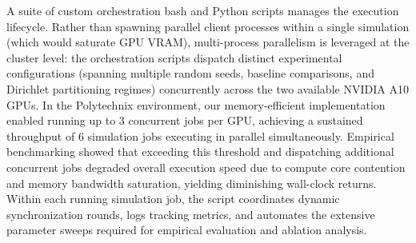 A suite of custom orchestration bash and Python scripts manages the execution lifecycle. Rather than spawning parallel client processes within a single simulation (which would saturate GPU VRAM), multi-process parallelism is leveraged at the cluster level: the orchestration scripts dispatch distinct experimental configurations (spanning multiple random seeds, baseline comparisons, and Dirichlet partitioning regimes) concurrently across the two available NVIDIA A10 GPUs. In the Polytechnix environment, our memory-efficient implementation enabled running up to $3$ concurrent jobs per GPU, achieving a sustained throughput of $6$ simulation jobs executing in parallel simultaneously. Empirical benchmarking showed that exceeding this threshold and dispatching additional concurrent jobs degraded overall execution speed due to compute core contention and memory bandwidth saturation, yielding diminishing wall-clock returns. Within each running simulation job, the script coordinates dynamic synchronization rounds, logs tracking metrics, and automates the extensive parameter sweeps required for empirical evaluation and ablation analysis.
